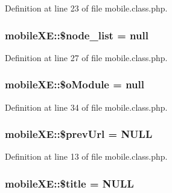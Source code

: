 Definition at line 23 of file mobile.\+class.\+php.

\subsubsection[{\texorpdfstring{\$node\+\_\+list}{$node_list}}]{\setlength{\rightskip}{0pt plus 5cm}mobile\+X\+E\+::\$node\+\_\+list = {\bf null}}\hypertarget{classmobileXE_af906479c52f412d0beae2252bad4ef35}{}\label{classmobileXE_af906479c52f412d0beae2252bad4ef35}


Definition at line 27 of file mobile.\+class.\+php.

\subsubsection[{\texorpdfstring{\$o\+Module}{$oModule}}]{\setlength{\rightskip}{0pt plus 5cm}mobile\+X\+E\+::\$o\+Module = {\bf null}}\hypertarget{classmobileXE_a64908b5e1d46537b4739036b1a00b689}{}\label{classmobileXE_a64908b5e1d46537b4739036b1a00b689}


Definition at line 34 of file mobile.\+class.\+php.

\subsubsection[{\texorpdfstring{\$prev\+Url}{$prevUrl}}]{\setlength{\rightskip}{0pt plus 5cm}mobile\+X\+E\+::\$prev\+Url = N\+U\+LL}\hypertarget{classmobileXE_acbc08c3fe06a6a5aaae6cbdc8738559f}{}\label{classmobileXE_acbc08c3fe06a6a5aaae6cbdc8738559f}


Definition at line 13 of file mobile.\+class.\+php.

\subsubsection[{\texorpdfstring{\$title}{$title}}]{\setlength{\rightskip}{0pt plus 5cm}mobile\+X\+E\+::\$title = N\+U\+LL}\hypertarget{classmobileXE_aeb2ef82029883fd60174e3d0e9f7dcc3}{}\label{classmobileXE_aeb2ef82029883fd60174e3d0e9f7dcc3}


